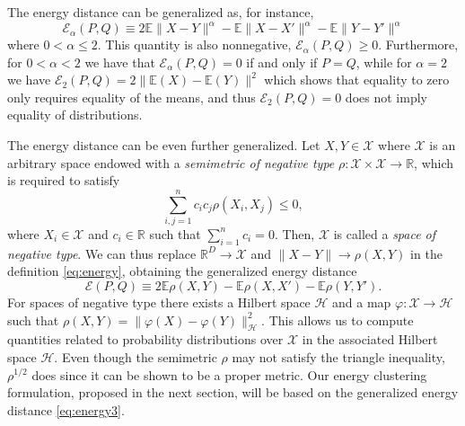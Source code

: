 \documentclass[aps,preprint,nofootinbib,floatfix]{revtex4-1}
\newcommand\Energy{\mathcal{E}}
\newcommand\E{\mathbb{E}}
\begin{document}
The energy distance can be generalized as, for instance,
\begin{equation}
\label{eq:energy2}
\Energy_\alpha(P, Q) \equiv 
2 \E \| X - Y\|^{\alpha} - \E \| X - X' \|^{\alpha} - 
\E \| Y - Y' \|^{\alpha}
\end{equation}
where $0<\alpha\le 2$. This quantity is also nonnegative,
$\Energy_\alpha(P,Q) \ge 0$. Furthermore, for $0<\alpha<2$ we have that
$\Energy_\alpha(P,Q) = 0$ if and only if $P=Q$, while for $\alpha=2$ 
we have $\Energy_2(P,Q) = 2\| \E(X) - \E(Y) \|^2$ which shows that
equality to zero only requires
equality of the means, and thus $\Energy_2(P,Q)=0$ does 
not imply equality of distributions.

The energy distance can be even further generalized.
Let $X, Y \in \mathcal{X}$  where $\mathcal{X}$ is an arbitrary space endowed
with a \emph{semimetric of negative type}
$\rho: \mathcal{X}\times\mathcal{X} \to \mathbb{R}$, which is required
to satisfy
\begin{equation}
\label{eq:negative_type}
\sum_{i,j=1}^n c_i c_j \rho(X_i, X_j) \le 0,
\end{equation}
where $X_i \in \mathcal{X}$ and $c_i \in \mathbb{R}$ such that
$\sum_{i=1}^n c_i = 0$. Then, $\mathcal{X}$ is called a \emph{space of
negative type}.
We can thus replace $\mathbb{R}^D \to \mathcal{X}$ and 
$\| X - Y \| \to \rho(X , Y)$ in the definition \eqref{eq:energy}, obtaining
the generalized energy distance
\begin{equation}
\label{eq:energy3}
\Energy(P, Q) \equiv 2 \E \rho(X,Y) - \E \rho(X, X') - \E \rho(Y,Y').
\end{equation}
For spaces of negative type there exists a Hilbert space $\mathcal{H}$ and
a map $\varphi: \mathcal{X} \to
\mathcal{H}$ such that
$\rho(X, Y) = \| \varphi(X) - \varphi(Y) \|_{\mathcal{H}}^2$. This
allows us to compute quantities related to probability distributions over
$\mathcal{X}$ in the associated Hilbert space $\mathcal{H}$.
Even though the semimetric 
$\rho$ may not satisfy the triangle inequality, 
$\rho^{1/2}$ does since it can be shown to be a proper metric. 
Our energy clustering formulation, proposed in the next section,
will be based on the generalized
energy distance \eqref{eq:energy3}.
\end{document}
